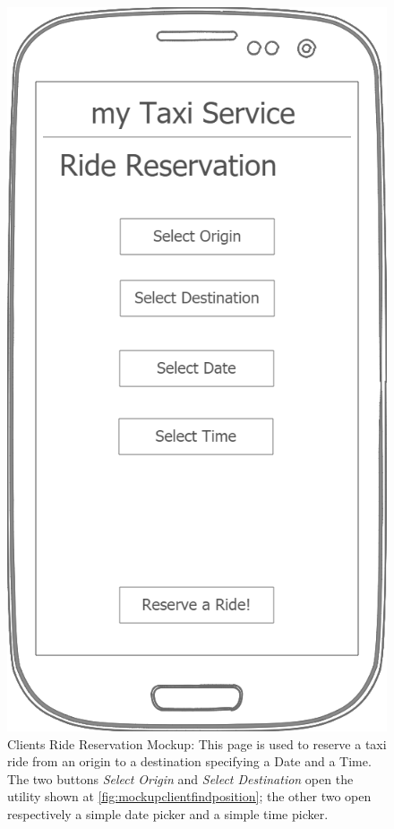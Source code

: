 \documentclass[a4paper]{article}
\begin{document}
\begin{figure}[H]
\includegraphics[width=\mockupWidth]{Mockup-ClientsRideReservation}
\centering
\caption[Clients Ride Reservation Mockup]{Clients Ride Reservation Mockup: \newline This page is used to reserve a taxi ride from an origin to a destination specifying a Date and a Time. The two buttons \emph{Select Origin} and \emph{Select Destination} open the utility shown at \autoref{fig:mockupclientfindposition}; the other two open respectively a simple date picker and a simple time picker.}
\label{fig:mockupclientridereservation}
\end{figure}
\end{document}
